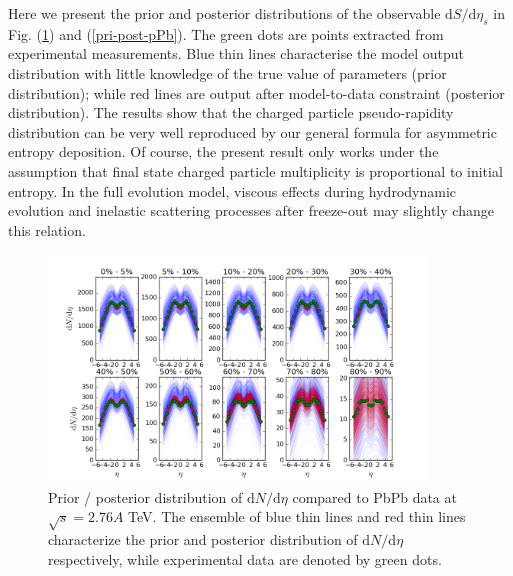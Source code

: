 \documentclass[aps,prl,twocolumn,groupedaddress]{revtex4-1}
\begin{document}
	Here we present the prior and posterior distributions of the observable $\mathrm{d}S/\mathrm{d}\eta_s$ in Fig. (\ref{pri-post-PbPb}) and (\ref{pri-post-pPb}).
	The green dots are points extracted from experimental measurements. 
	Blue thin lines characterise the model output distribution with little knowledge of the true value of parameters (prior distribution); while red lines are output after model-to-data constraint (posterior distribution).
	The results show that the charged particle pseudo-rapidity distribution can be very well reproduced by our general formula for asymmetric entropy deposition.
	Of course, the present result only works under the assumption that final state charged particle multiplicity is proportional to initial entropy. 
	In the full evolution model, viscous effects during hydrodynamic evolution and inelastic scattering processes after freeze-out may slightly change this relation.
	
	\begin{figure}
	\begin{center}
	\includegraphics[width=0.9\textwidth]{pics/pri-post-PbPb.png}
	\caption{Prior / posterior distribution of $\mathrm{d}N/\mathrm{d}\eta$ compared to PbPb data at $\sqrt{s} = 2.76 A$ TeV. The ensemble of blue thin lines and red thin lines characterize the prior and posterior distribution of $\mathrm{d}N/\mathrm{d}\eta$ respectively, while experimental data are denoted by green dots.}\label{pri-post-PbPb}
	\end{center}
	\end{figure}
	
\end{document}

